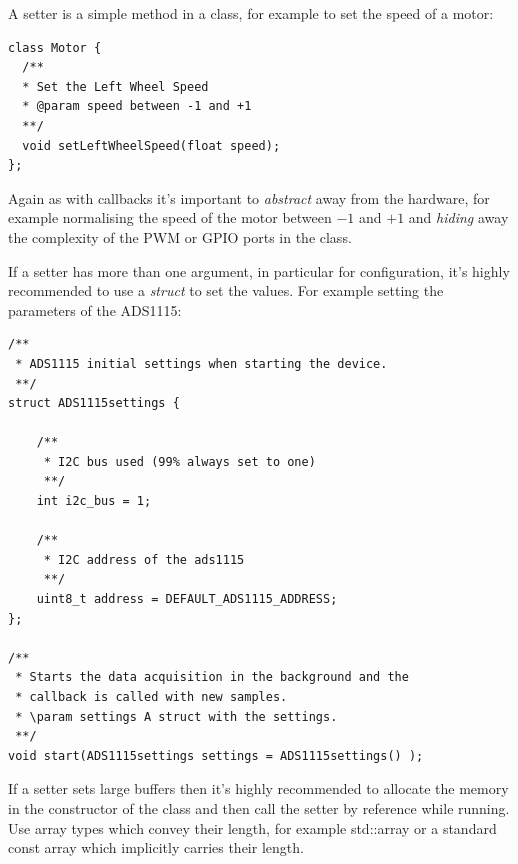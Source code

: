 \documentclass[12pt]{report}
\begin{document}
A setter is a simple method in a class, for example to set the
speed of a motor:
\begin{verbatim}
class Motor {
  /**
  * Set the Left Wheel Speed
  * @param speed between -1 and +1
  **/
  void setLeftWheelSpeed(float speed);
};
\end{verbatim}
Again as with callbacks it's important to \textsl{abstract} away from the
hardware, for example normalising the speed of the
motor between $-1$ and $+1$ and \textsl{hiding} away the complexity of the
PWM or GPIO ports in the class.

If a setter has more than one argument, in particular for
configuration, it's highly recommended to use a \textsl{struct} to set
the values. For example setting the parameters of the ADS1115:
\begin{verbatim}
/**
 * ADS1115 initial settings when starting the device.
 **/
struct ADS1115settings {

	/**
	 * I2C bus used (99% always set to one)
	 **/
	int i2c_bus = 1;

	/**
	 * I2C address of the ads1115
	 **/
	uint8_t address = DEFAULT_ADS1115_ADDRESS;
};

/**
 * Starts the data acquisition in the background and the
 * callback is called with new samples.
 * \param settings A struct with the settings.
 **/
void start(ADS1115settings settings = ADS1115settings() );
\end{verbatim}

If a setter sets large buffers then it's highly recommended
to allocate the memory in the constructor of the class and then call the setter by reference
while running. Use array types which convey their length, for example
std::array or a standard const array which implicitly carries their length.
\end{document}
